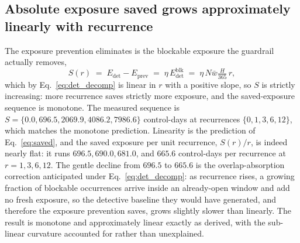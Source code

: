 \documentclass[journal]{IEEEtran}
\begin{document}
\subsection{Absolute exposure saved grows approximately linearly with recurrence}
The exposure prevention eliminates is the blockable exposure the guardrail actually removes,
\begin{equation}
S(r) \;=\; E_{\text{det}} - E_{\text{prev}} \;=\; \eta\, E^{\text{blk}}_{\text{det}}
\;=\; \eta\, N \bar w \tfrac{H}{365}\, r,
\label{eq:saved}
\end{equation}
which by Eq.~\eqref{eq:det_decomp} is linear in $r$ with a positive slope, so $S$ is strictly
increasing: more recurrence saves strictly more exposure, and the saved-exposure sequence is
monotone. The measured sequence is $S = \{0.0, 696.5, 2069.9, 4086.2, 7986.6\}$ control-days at
recurrences $\{0, 1, 3, 6, 12\}$, which matches the monotone prediction. Linearity is the
prediction of Eq.~\eqref{eq:saved}, and the saved exposure per unit recurrence, $S(r)/r$, is indeed
nearly flat: it runs $696.5, 690.0, 681.0$, and $665.6$ control-days per recurrence at
$r = 1, 3, 6, 12$. The gentle decline from $696.5$ to $665.6$ is the overlap-absorption correction
anticipated under Eq.~\eqref{eq:det_decomp}: as recurrence rises, a growing fraction of blockable
occurrences arrive inside an already-open window and add no fresh exposure, so the detective
baseline they would have generated, and therefore the exposure prevention saves, grows slightly
slower than linearly. The result is monotone and approximately linear exactly as derived, with the
sub-linear curvature accounted for rather than unexplained.
\end{document}
